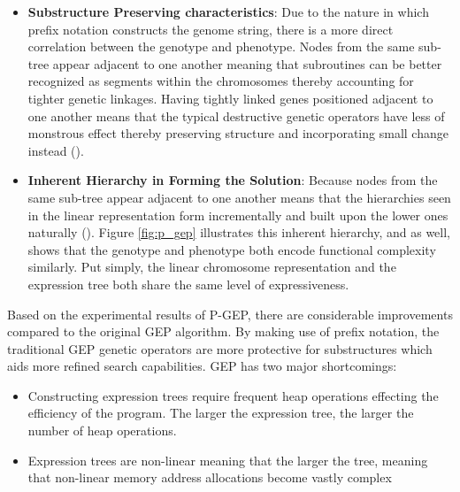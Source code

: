 \begin{itemize}
    \item \textbf{Substructure Preserving characteristics}: Due to the nature in which prefix notation constructs the genome string, there is a more direct correlation between the genotype and phenotype. Nodes from the same sub-tree appear adjacent to one another meaning that subroutines can be better recognized as segments within the chromosomes thereby accounting for tighter genetic linkages. Having tightly linked genes positioned adjacent to one another means that the typical destructive genetic operators have less of monstrous effect thereby preserving structure and incorporating small change instead (\cite{li2005prefix}).
    \item \textbf{Inherent Hierarchy in Forming the Solution}: Because nodes from the same sub-tree appear adjacent to one another means that the hierarchies seen in the linear representation form incrementally and built upon the lower ones naturally (\cite{li2005prefix}). Figure \ref{fig:p_gep} illustrates this inherent hierarchy, and as well, shows that the genotype and phenotype both encode functional complexity similarly. Put simply, the linear chromosome representation and the expression tree both share the same level of expressiveness.
\end{itemize}

\parbreak\noindent Based on the experimental results of P-GEP, there are considerable improvements compared to the original GEP algorithm. By making use of prefix notation, the traditional GEP genetic operators are more protective for substructures which aids more refined search capabilities. GEP has two major shortcomings:

\begin{itemize}
    \item Constructing expression trees require frequent heap operations effecting the efficiency of the program. The larger the expression tree, the larger the number of heap operations.
    \item Expression trees are non-linear meaning that the larger the tree, meaning that non-linear memory address allocations become vastly complex
\end{itemize}

